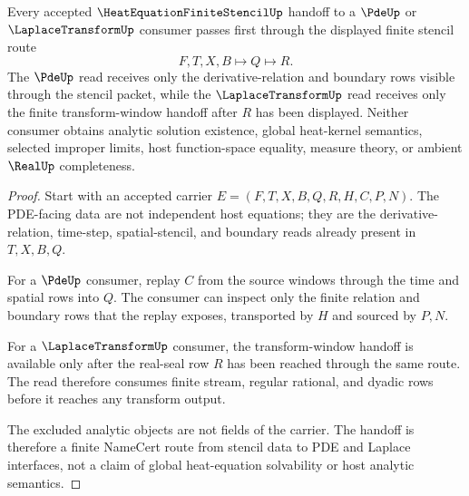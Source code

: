 \begin{theorem}
\label{thm:heat-equation-finite-stencil-laplace-pde-handoff}
Every accepted $\HeatEquationFiniteStencilUp$ handoff to a $\PdeUp$ or
$\LaplaceTransformUp$ consumer passes first through the displayed finite
stencil route
$$
F,T,X,B\longmapsto Q\longmapsto R.
$$
The $\PdeUp$ read receives only the derivative-relation and boundary rows
visible through the stencil packet, while the $\LaplaceTransformUp$ read
receives only the finite transform-window handoff after $R$ has been displayed.
Neither consumer obtains analytic solution existence, global heat-kernel
semantics, selected improper limits, host function-space equality, measure
theory, or ambient $\RealUp$ completeness.
\end{theorem}
\begin{proof}
Start with an accepted carrier
$E=(F,T,X,B,Q,R,H,C,P,N)$. The PDE-facing data are not independent host
equations; they are the derivative-relation, time-step, spatial-stencil, and
boundary reads already present in $T,X,B,Q$.

For a $\PdeUp$ consumer, replay $C$ from the source windows through the time
and spatial rows into $Q$. The consumer can inspect only the finite relation
and boundary rows that the replay exposes, transported by $H$ and sourced by
$P,N$.

For a $\LaplaceTransformUp$ consumer, the transform-window handoff is available
only after the real-seal row $R$ has been reached through the same route. The
read therefore consumes finite stream, regular rational, and dyadic rows
before it reaches any transform output.

The excluded analytic objects are not fields of the carrier. The handoff is
therefore a finite NameCert route from stencil data to PDE and Laplace
interfaces, not a claim of global heat-equation solvability or host analytic
semantics.
\end{proof}



